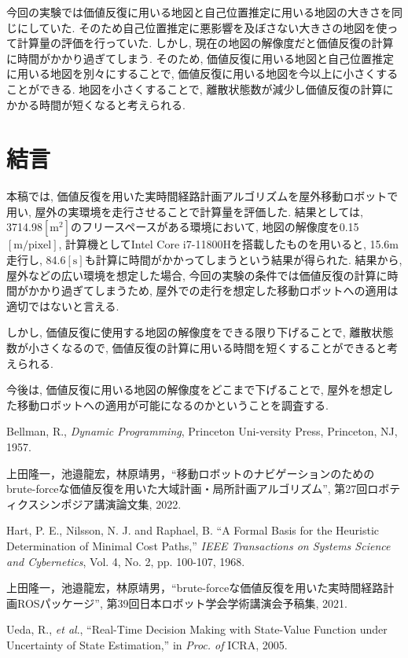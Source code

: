 \documentclass{jarticle}
\begin{document}
今回の実験では価値反復に用いる地図と自己位置推定に用いる地図の大きさを同じにしていた. 
そのため自己位置推定に悪影響を及ぼさない大きさの地図を使って計算量の評価を行っていた. 
しかし, 現在の地図の解像度だと価値反復の計算に時間がかかり過ぎてしまう. 
そのため, 価値反復に用いる地図と自己位置推定に用いる地図を別々にすることで, 価値反復に用いる地図を今以上に小さくすることができる. 
地図を小さくすることで, 離散状態数が減少し価値反復の計算にかかる時間が短くなると考えられる. 
\section{結言}%
本稿では, 価値反復を用いた実時間経路計画アルゴリズムを屋外移動ロボットで用い, 屋外の実環境を走行させることで計算量を評価した. 
結果としては, 3714.98$\mathrm{[m^2]}$のフリースペースがある環境において, 地図の解像度を0.15$\mathrm{[m/pixel]}$, 計算機としてIntel Core i7-11800Hを搭載したものを用いると, 
15.6$\mathrm{m}$走行し, 84.6$\mathrm{[s]}$も計算に時間がかかってしまうという結果が得られた. 
結果から, 屋外などの広い環境を想定した場合, 今回の実験の条件では価値反復の計算に時間がかかり過ぎてしまうため, 
屋外での走行を想定した移動ロボットへの適用は適切ではないと言える.

しかし, 価値反復に使用する地図の解像度をできる限り下げることで, 離散状態数が小さくなるので, 価値反復の計算に用いる時間を短くすることができると考えられる.

今後は, 価値反復に用いる地図の解像度をどこまで下げることで, 屋外を想定した移動ロボットへの適用が可能になるのかということを調査する. 

\footnotesize
\begin{thebibliography}{99}

	Bellman, R., {\it Dynamic Programming}, Princeton Uni-versity Press, Princeton, NJ, 1957.

	上田隆一，池邉龍宏，林原靖男，``移動ロボットのナビゲーションのためのbrute-forceな価値反復を用いた大域計画・局所計画アルゴリズム'', 
	第27回ロボティクスシンポジア講演論文集, 2022.
	
	Hart, P. E., Nilsson, N. J. and Raphael, B. ``A Formal
	Basis for the Heuristic Determination of Minimal Cost
	Paths,'' {\it IEEE Transactions on Systems Science and Cybernetics}, Vol. 4, No. 2, pp. 100-107, 1968.
	
	上田隆一，池邉龍宏，林原靖男，``brute-forceな価値反復を用いた実時間経路計画ROSパッケージ'', 
	第39回日本ロボット学会学術講演会予稿集, 2021.

	Ueda, R., {\it et al}., ``Real-Time Decision Making with State-Value Function under Uncertainty of State Estimation,''
	 in {\it Proc. of} ICRA, 2005.

\end{thebibliography}

\normalsize
\end{document}
